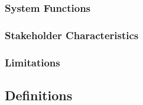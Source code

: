 \subsubsection{System Functions}

\subsubsection{Stakeholder Characteristics}

\subsubsection{Limitations}

\subsection{Definitions}
